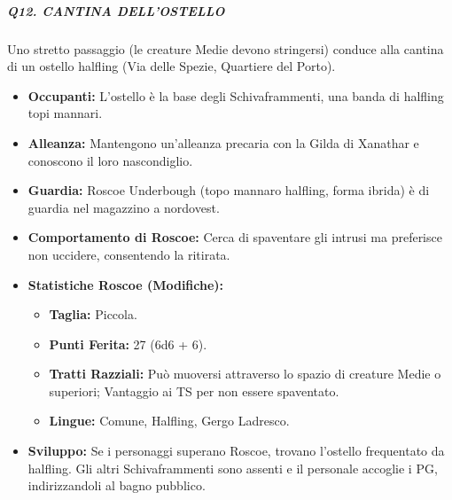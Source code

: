\documentclass{article}
\begin{document}
\subparagraph{Q12. CANTINA DELL'OSTELLO}
Uno stretto passaggio (le creature Medie devono stringersi) conduce alla cantina di un ostello halfling (Via delle Spezie, Quartiere del Porto).
\begin{itemize}
    \item \textbf{Occupanti:} L'ostello è la base degli Schivaframmenti, una banda di halfling topi mannari.
    \item \textbf{Alleanza:} Mantengono un'alleanza precaria con la Gilda di Xanathar e conoscono il loro nascondiglio.
    \item \textbf{Guardia:} Roscoe Underbough (topo mannaro halfling, forma ibrida) è di guardia nel magazzino a nordovest.
    \item \textbf{Comportamento di Roscoe:} Cerca di spaventare gli intrusi ma preferisce non uccidere, consentendo la ritirata.
    \item \textbf{Statistiche Roscoe (Modifiche):}
    \begin{itemize}
        \item \textbf{Taglia:} Piccola.
        \item \textbf{Punti Ferita:} 27 (6d6 + 6).
        \item \textbf{Tratti Razziali:} Può muoversi attraverso lo spazio di creature Medie o superiori; Vantaggio ai TS per non essere spaventato.
        \item \textbf{Lingue:} Comune, Halfling, Gergo Ladresco.
    \end{itemize}
    \item \textbf{Sviluppo:} Se i personaggi superano Roscoe, trovano l'ostello frequentato da halfling. Gli altri Schivaframmenti sono assenti e il personale accoglie i PG, indirizzandoli al bagno pubblico.
\end{itemize}
\end{document}
